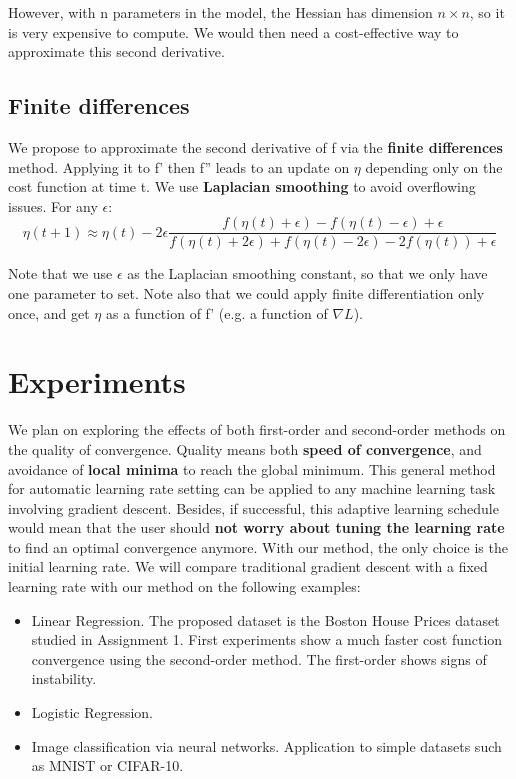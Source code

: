 \documentclass[]{article}
\begin{document}
However, with n parameters in the model, the Hessian has dimension $n \times n$, so it is very expensive to compute. We would then need a cost-effective way to approximate this second derivative. 

\subsection{Finite differences}
We propose to approximate the second derivative of f via the \textbf{finite differences} method. Applying it to f' then f'' leads to an update on $\eta$ depending only on the cost function at time t. We use \textbf{Laplacian smoothing} to avoid overflowing issues.  
For any $\epsilon$:\\

\begin{equation}
\eta(t+1) \approx \eta(t) -2\epsilon\frac{f(\eta(t)+\epsilon)-f(\eta(t)-\epsilon) + \epsilon}{f(\eta(t)+2\epsilon)+f(\eta(t)-2\epsilon)-2f(\eta(t)) + \epsilon} 
\end{equation}

Note that we use $\epsilon$ as the Laplacian smoothing constant, so that we only have one parameter to set. Note also that we could apply finite differentiation only once, and get $\eta$ as a function of f' (e.g. a function of $\nabla L$).

\section{Experiments}
We plan on exploring the effects of both first-order and second-order methods on the quality of convergence. Quality means both \textbf{speed of convergence}, and avoidance of \textbf{local minima} to reach the global minimum. This general method for automatic learning rate setting can be applied to any machine learning task involving gradient descent. Besides, if successful, this adaptive learning schedule would mean that the user should \textbf{not worry about tuning the learning rate} to find an optimal convergence anymore. With our method, the only choice is the initial learning rate. We will compare traditional gradient descent with a fixed learning rate with our method on the following examples:\\
\begin{itemize}
\item Linear Regression. The proposed dataset is the Boston House Prices dataset studied in Assignment 1. First experiments show a much faster cost function convergence using the second-order method. The first-order shows signs of instability.
\item Logistic Regression. 
\item Image classification via neural networks. Application to simple datasets such as MNIST or CIFAR-10. 	
\end{itemize}
\end{document}
